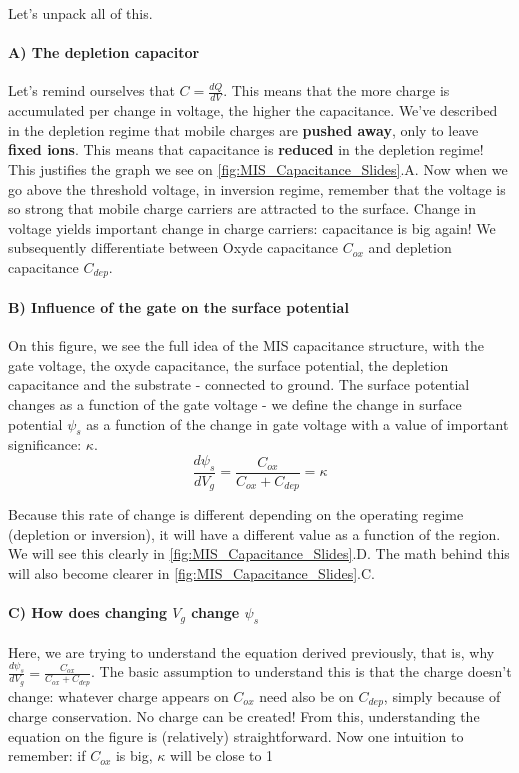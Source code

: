 Let's unpack all of this. 

\paragraph{A) The depletion capacitor} Let's remind ourselves that $C = \frac{dQ}{dV}$. This means that the more charge is accumulated per change in voltage, the higher the capacitance. We've described in the depletion regime that mobile charges are \textbf{pushed away}, only to leave \textbf{fixed ions}. This means that capacitance is \textbf{reduced} in the depletion regime! This justifies the graph we see on \ref{fig:MIS_Capacitance_Slides}.A. Now when we go above the threshold voltage, in inversion regime, remember that the voltage is so strong that mobile charge carriers are attracted to the surface. Change in voltage yields important change in charge carriers: capacitance is big again! We subsequently differentiate between Oxyde capacitance $C_{ox}$ and depletion capacitance $C_{dep}$.

\paragraph{B) Influence of the gate on the surface potential} On this figure, we see the full idea of the MIS capacitance structure, with the gate voltage, the oxyde capacitance, the surface potential, the depletion capacitance and the substrate - connected to ground. The surface potential changes as a function of the gate voltage - we define the change in surface potential $\psi_s$ as a function of the change in gate voltage with a value of important significance: $\kappa$. 
\begin{equation}
    \frac{d\psi_s}{dV_g} = \frac{C_{ox}}{C_{ox} + C_{dep}} =  \kappa
\end{equation} 

Because this rate of change is different depending on the operating regime (depletion or inversion), it will have a different value as a function of the region. We will see this clearly in \ref{fig:MIS_Capacitance_Slides}.D. The math behind this will also become clearer in \ref{fig:MIS_Capacitance_Slides}.C.

\paragraph{C) How does changing $V_g$ change $\psi_s$} Here, we are trying to understand the equation derived previously, that is, why $\frac{d\psi_s}{dV_g} = \frac{C_{ox}}{C_{ox} + C_{dep}}$. The basic assumption to understand this is that the charge doesn't change: whatever charge appears on $C_{ox}$ need also be on $C_{dep}$, simply because of charge conservation. No charge can be created! From this, understanding the equation on the figure is (relatively) straightforward. 
Now one intuition to remember: if $C_{ox}$ is big, $\kappa$ will be close to 1

